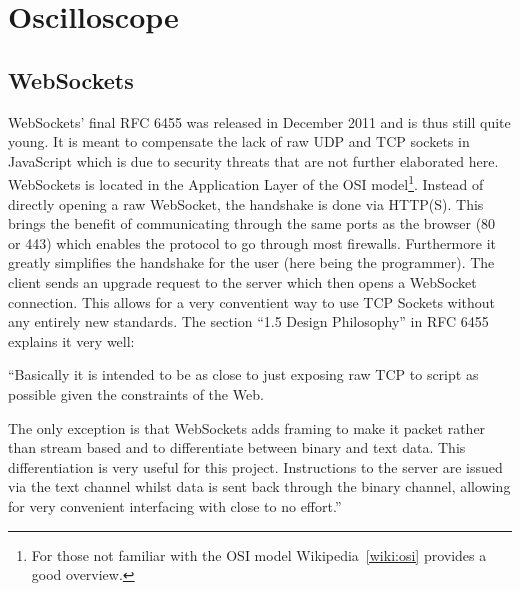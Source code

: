 %
%
\chapter{Oscilloscope} %
\label{ch:app:gui}

%
%
\section{WebSockets} %
\label{sec:app:gui:websockets}

WebSockets' final RFC 6455\cite{rfc:6455} was released in December 2011 and is
thus still quite young. It is meant to  compensate the lack of raw UDP and TCP
sockets in  JavaScript which is due  to security threats that  are not further
elaborated here.
WebSockets is located  in the Application Layer of  the OSI model\footnote{For
those not familiar with the OSI model Wikipedia~\ref{wiki:osi} provides a good
overview.}.
Instead  of directly  opening  a  raw WebSocket,  the  handshake  is done  via
HTTP(S). This brings  the benefit of  communicating through the same  ports as
the  browser  (80 or  443)  which  enables the  protocol  to  go through  most
firewalls. Furthermore it greatly simplifies the  handshake for the user (here
being the programmer).
The client sends an upgrade request to the server which then opens a WebSocket
connection.
This allows for a very conventient way to use TCP Sockets without any entirely
new standards.
The section ``1.5  Design Philosophy'' in RFC  6455\cite{rfc:6455} explains it
very well:

``Basically it is intended  to be as close to just exposing  raw TCP to script
as possible given the constraints of the Web.

The only  exception is that WebSockets  adds framing to make  it packet rather
than stream based and to differentiate between binary and text data.
This  differentiation is  very useful  for this  project. Instructions to  the
server are issued  via the text channel  whilst data is sent  back through the
binary  channel, allowing  for very  convenient interfacing  with close  to no
effort.''

